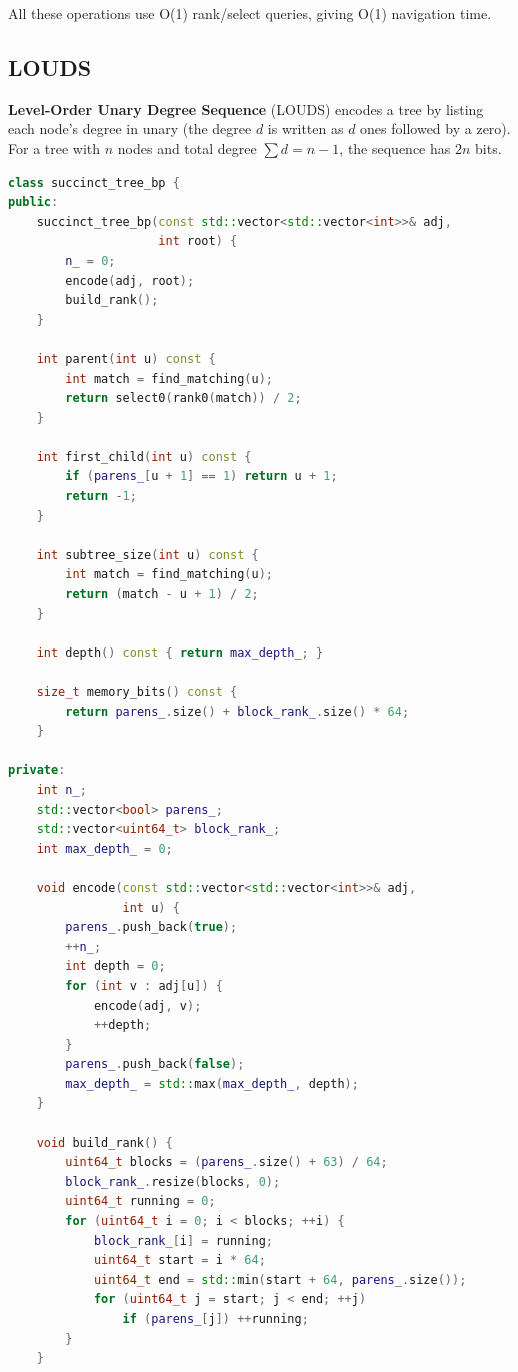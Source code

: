 All these operations use O(1) rank/select queries, giving O(1) navigation time.

\subsection{LOUDS}

\textbf{Level-Order Unary Degree Sequence} (LOUDS) encodes a tree by listing each node's degree in unary (the degree $d$ is written as $d$ ones followed by a zero). For a tree with $n$ nodes and total degree $\sum d = n-1$, the sequence has $2n$ bits.

\begin{lstlisting}[language=C++]
class succinct_tree_bp {
public:
    succinct_tree_bp(const std::vector<std::vector<int>>& adj,
                     int root) {
        n_ = 0;
        encode(adj, root);
        build_rank();
    }

    int parent(int u) const {
        int match = find_matching(u);
        return select0(rank0(match)) / 2;
    }

    int first_child(int u) const {
        if (parens_[u + 1] == 1) return u + 1;
        return -1;
    }

    int subtree_size(int u) const {
        int match = find_matching(u);
        return (match - u + 1) / 2;
    }

    int depth() const { return max_depth_; }

    size_t memory_bits() const {
        return parens_.size() + block_rank_.size() * 64;
    }

private:
    int n_;
    std::vector<bool> parens_;
    std::vector<uint64_t> block_rank_;
    int max_depth_ = 0;

    void encode(const std::vector<std::vector<int>>& adj,
                int u) {
        parens_.push_back(true);
        ++n_;
        int depth = 0;
        for (int v : adj[u]) {
            encode(adj, v);
            ++depth;
        }
        parens_.push_back(false);
        max_depth_ = std::max(max_depth_, depth);
    }

    void build_rank() {
        uint64_t blocks = (parens_.size() + 63) / 64;
        block_rank_.resize(blocks, 0);
        uint64_t running = 0;
        for (uint64_t i = 0; i < blocks; ++i) {
            block_rank_[i] = running;
            uint64_t start = i * 64;
            uint64_t end = std::min(start + 64, parens_.size());
            for (uint64_t j = start; j < end; ++j)
                if (parens_[j]) ++running;
        }
    }


\end{lstlisting}
